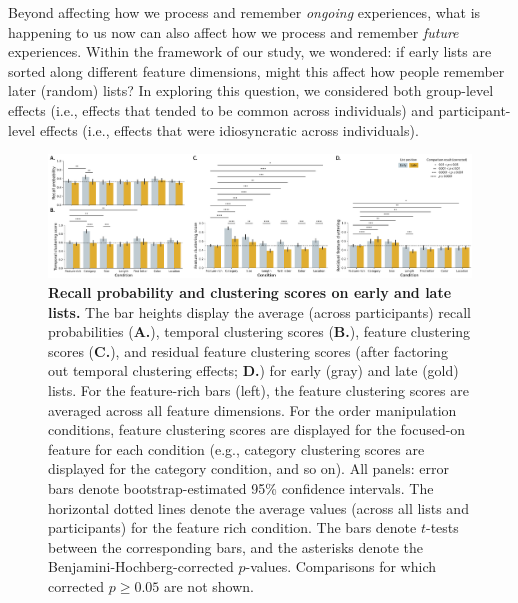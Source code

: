 \documentclass[11pt]{article}
\begin{document}
Beyond affecting how we process and remember \textit{ongoing} experiences, what
is happening to us now can also affect how we process and remember
\textit{future} experiences. Within the framework of our study, we wondered: if
early lists are sorted along different feature dimensions, might this affect
how people remember later (random) lists? In exploring this question, we
considered both group-level effects (i.e., effects that tended to be common
across individuals) and participant-level effects (i.e., effects that were
idiosyncratic across individuals).

\begin{figure}

    \centering
    \includegraphics[width=\textwidth]{figures/memory_perf_barchart_compare}

\caption{\textbf{Recall probability and clustering scores on early and late
lists.} The bar heights display the average (across participants) recall
probabilities (\textbf{A.}), temporal clustering scores (\textbf{B.}), feature
clustering scores (\textbf{C.}), and residual feature clustering scores (after
factoring out temporal clustering effects; \textbf{D.}) for early (gray) and
late (gold) lists. For the feature-rich bars (left), the feature clustering
scores are averaged across all feature dimensions. For the order manipulation
conditions, feature clustering scores are displayed for the focused-on feature
for each condition (e.g., category clustering scores are displayed for the
category condition, and so on). All panels: error bars denote
bootstrap-estimated 95\% confidence intervals. The horizontal dotted lines
denote the average values (across all lists and participants) for the feature
rich condition. The bars denote $t$-tests between the corresponding bars, and
the asterisks denote the Benjamini-Hochberg-corrected $p$-values. Comparisons
for which corrected $p \geq 0.05$ are not shown.} \label{fig:barplots}

\end{figure}
\end{document}
